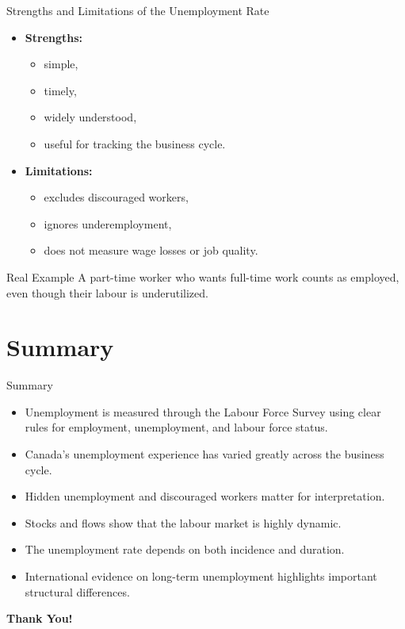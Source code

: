 \documentclass[aspectratio=169]{beamer}
\begin{document}
\begin{frame}{Strengths and Limitations of the Unemployment Rate}
\transfade
\begin{itemize}
  \item \textbf{Strengths:}
  \begin{itemize}
    \item simple,
    \item timely,
    \item widely understood,
    \item useful for tracking the business cycle.
  \end{itemize}
  \item \textbf{Limitations:}
  \begin{itemize}
    \item excludes discouraged workers,
    \item ignores underemployment,
    \item does not measure wage losses or job quality.
  \end{itemize}
\end{itemize}

\begin{exampleblock}{Real Example}
A part-time worker who wants full-time work counts as employed, even though their labour is underutilized.
\end{exampleblock}
\end{frame}

\section{Summary}

\begin{frame}{Summary}
\transfade
\begin{itemize}
  \item Unemployment is measured through the Labour Force Survey using clear rules for employment, unemployment, and labour force status.
  \item Canada's unemployment experience has varied greatly across the business cycle.
  \item Hidden unemployment and discouraged workers matter for interpretation.
  \item Stocks and flows show that the labour market is highly dynamic.
  \item The unemployment rate depends on both incidence and duration.
  \item International evidence on long-term unemployment highlights important structural differences.
\end{itemize}


\end{frame}

\begin{frame}
\centering
\Huge{\textbf{Thank You!}}
\end{frame}
\end{document}
